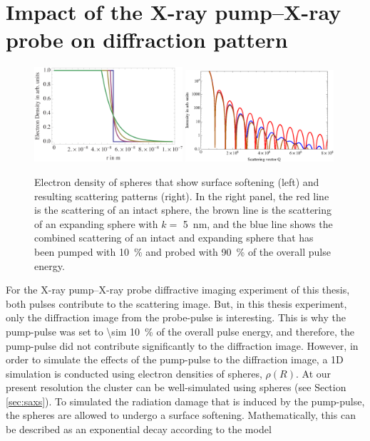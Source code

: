 \section{Impact of the X-ray pump--X-ray probe on diffraction pattern}\label{sec:pump--probe-considerations}
\begin{figure}
	\centering
		\includegraphics[width=0.49\textwidth]{images/electron-density-convoluted-object.png}
		\includegraphics[width=0.49\textwidth]{images/beam-convoluted-with-object.eps}
	\caption[Influence of X-ray pump--X-ray probe pulses to a diffraction image.]{Electron density of spheres that show surface softening (left) and resulting scattering patterns (right). In the right panel, the red line is the scattering of an intact sphere, the brown line is the scattering of an expanding sphere with $k=$ \SI{5}{\nano\meter}, and the blue line shows the combined scattering of an intact and expanding sphere that has been pumped with \SI{10}{\percent} and probed with \SI{90}{\percent} of the overall pulse energy.}
	\label{fig:electron-density-convoluted-object}
\end{figure}
For the X-ray pump--X-ray probe diffractive imaging experiment of this thesis, both pulses contribute to the scattering image. But, in this thesis experiment, only the diffraction image from the probe-pulse is interesting. This is why the pump-pulse was set to \SI{\sim 10}{\percent} of the overall pulse energy, and therefore, the pump-pulse did not contribute significantly to the diffraction image. However, in order to simulate the effects of the pump-pulse to the diffraction image, a 1D simulation is conducted using electron densities of spheres, $\rho\left(R\right)$. At our present resolution the cluster can be well-simulated using spheres (see Section \ref{sec:saxs}). To simulated the radiation damage that is induced by the pump-pulse, the spheres are allowed to undergo a surface softening. Mathematically, this can be described as an exponential decay according to the model \cite{Gorkhover-2016-NatPho}
